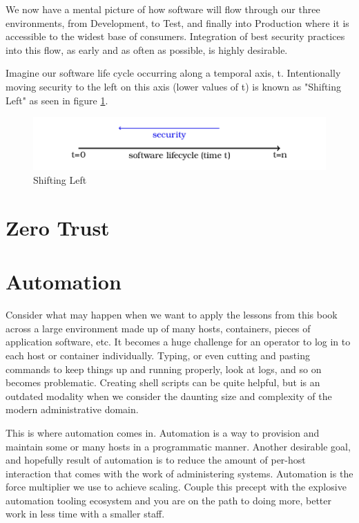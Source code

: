 \justify
We now have a mental picture of how software will flow through our
three environments, from Development, to Test, and finally into Production
where it is accessible to the widest base of consumers. Integration of 
best security practices into this flow, as early and as often as possible, 
is highly desirable. 

\justify
Imagine our software life cycle occurring along a temporal 
axis, t. Intentionally moving security to the left on this axis (lower 
values of t) is known as "Shifting Left" as seen in 
figure \ref{fig:shift}.

\justify
\begin{figure}[!htb]
	\centering
	\includegraphics{../images/shift_left.png}
	\caption{Shifting Left}
	\label{fig:shift}
\end{figure}

\section{Zero Trust}

\section{Automation}

\justify
Consider what may happen when we want to apply the lessons from this book across a large environment made up of many hosts, containers, pieces of application software, etc. It becomes a huge challenge for an operator to log in to each host or container individually. Typing, or even cutting and pasting commands to keep things up and running properly, look at logs, and so on becomes problematic. Creating shell scripts can be quite helpful, but is an outdated modality when we consider the daunting size and complexity of the modern administrative domain.

\justify
This is where automation comes in. Automation is a way to provision and maintain some or many hosts in a programmatic manner. Another desirable goal, and hopefully result of automation is to reduce the amount of per-host interaction that comes with the work of administering systems. Automation is the force multiplier we use to achieve scaling. Couple this precept with the explosive automation tooling ecosystem and you are on the path to doing more, better work in less time with a smaller staff. 

